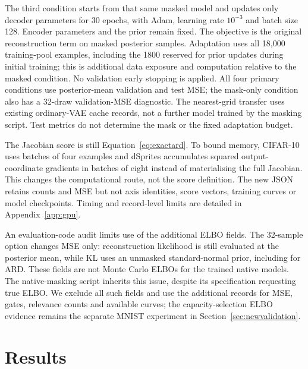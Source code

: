 \documentclass[make,article,submit,pdftex,moreauthors]{Definitions/mdpi}
\begin{document}
The third condition starts from that same masked model and updates only
decoder parameters for 30 epochs, with Adam, learning rate $10^{-3}$ and
batch size 128. Encoder parameters and the prior remain fixed.
The objective is the original reconstruction term on masked posterior
samples. Adaptation uses all 18,000 training-pool examples, including
the 1800 reserved for prior updates during initial training; this is
additional data exposure and computation relative to the masked
condition. No validation early stopping is applied. All four primary
conditions use posterior-mean validation and test MSE; the mask-only
condition also has a 32-draw validation-MSE diagnostic. The nearest-grid
transfer uses existing ordinary-VAE cache records, not a further model
trained by the masking script. Test metrics do not determine the mask
or the fixed adaptation budget.

The Jacobian score is still Equation~\eqref{eq:exactard}. To bound memory,
CIFAR-10 uses batches of four examples and dSprites accumulates squared
output-coordinate gradients in batches of eight instead of materialising
the full Jacobian. This changes the computational route, not the score
definition. The new JSON retains counts and MSE but not axis identities,
score vectors, training curves or model checkpoints. Timing and
record-level limits are detailed in Appendix~\ref{app:gpu}.

An evaluation-code audit limits use of the additional ELBO fields.
The 32-sample option changes MSE only: reconstruction likelihood is still
evaluated at the posterior mean, while KL uses an unmasked standard-normal
prior, including for ARD. These fields are not Monte Carlo ELBOs for the
trained native models. The native-masking script inherits this issue,
despite its specification requesting true ELBO. We exclude all such
fields and use the additional records for MSE, gates, relevance counts
and available curves; the capacity-selection ELBO evidence
remains the separate MNIST experiment in Section~\ref{sec:newvalidation}.


\section{Results}\label{sec:results}
\end{document}
